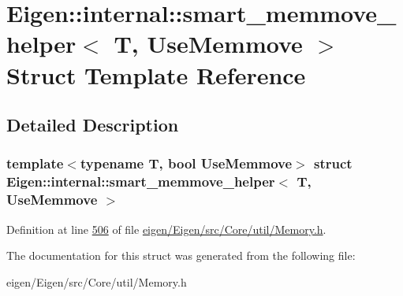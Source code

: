\hypertarget{struct_eigen_1_1internal_1_1smart__memmove__helper}{}\section{Eigen\+:\+:internal\+:\+:smart\+\_\+memmove\+\_\+helper$<$ T, Use\+Memmove $>$ Struct Template Reference}
\label{struct_eigen_1_1internal_1_1smart__memmove__helper}


\subsection{Detailed Description}
\subsubsection*{template$<$typename T, bool Use\+Memmove$>$\newline
struct Eigen\+::internal\+::smart\+\_\+memmove\+\_\+helper$<$ T, Use\+Memmove $>$}



Definition at line \hyperlink{eigen_2_eigen_2src_2_core_2util_2_memory_8h_source_l00506}{506} of file \hyperlink{eigen_2_eigen_2src_2_core_2util_2_memory_8h_source}{eigen/\+Eigen/src/\+Core/util/\+Memory.\+h}.



The documentation for this struct was generated from the following file\+:\begin{DoxyCompactItemize}
\item 
eigen/\+Eigen/src/\+Core/util/\+Memory.\+h\end{DoxyCompactItemize}
